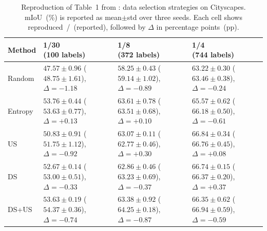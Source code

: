 \begin{table}[H]
\centering
\caption{Reproduction of Table~1 from \cite{hoyer2023improving}: data
selection strategies on Cityscapes. mIoU~(\%) is reported as
mean$\pm$std over three seeds. Each cell shows
reproduced~/~{\scriptsize (reported)}, followed by $\Delta$ in
percentage points~(pp).}
\label{tab:table1_repro}
\renewcommand{\arraystretch}{1.6}
\small
\begin{tabularx}{\textwidth}{lXXX}
\toprule
\textbf{Method} &
\makecell[c]{\textbf{1/30} \\ \textbf{(100 labels)}} &
\makecell[c]{\textbf{1/8} \\ \textbf{(372 labels)}} &
\makecell[c]{\textbf{1/4} \\ \textbf{(744 labels)}} \\
\midrule
Random &
\makecell[c]{$47.57 \pm 0.96$ \\ {\scriptsize ($48.75 \pm 1.61$), $\Delta=-1.18$}} &
\makecell[c]{$58.25 \pm 0.43$ \\ {\scriptsize ($59.14 \pm 1.02$), $\Delta=-0.89$}} &
\makecell[c]{$63.22 \pm 0.30$ \\ {\scriptsize ($63.46 \pm 0.38$), $\Delta=-0.24$}} \\
Entropy &
\makecell[c]{$53.76 \pm 0.44$ \\ {\scriptsize ($53.63 \pm 0.77$), $\Delta=+0.13$}} &
\makecell[c]{$63.61 \pm 0.78$ \\ {\scriptsize ($63.51 \pm 0.68$), $\Delta=+0.10$}} &
\makecell[c]{$65.57 \pm 0.62$ \\ {\scriptsize ($66.18 \pm 0.50$), $\Delta=-0.61$}} \\
US &
\makecell[c]{$50.83 \pm 0.91$ \\ {\scriptsize ($51.75 \pm 1.12$), $\Delta=-0.92$}} &
\makecell[c]{$63.07 \pm 0.11$ \\ {\scriptsize ($62.77 \pm 0.46$), $\Delta=+0.30$}} &
\makecell[c]{$66.84 \pm 0.34$ \\ {\scriptsize ($66.76 \pm 0.45$), $\Delta=+0.08$}} \\
DS &
\makecell[c]{$52.67 \pm 0.14$ \\ {\scriptsize ($53.00 \pm 0.51$), $\Delta=-0.33$}} &
\makecell[c]{$62.86 \pm 0.46$ \\ {\scriptsize ($63.23 \pm 0.69$), $\Delta=-0.37$}} &
\makecell[c]{$66.74 \pm 0.15$ \\ {\scriptsize ($66.37 \pm 0.20$), $\Delta=+0.37$}} \\
DS+US &
\makecell[c]{$53.63 \pm 0.19$ \\ {\scriptsize ($54.37 \pm 0.36$), $\Delta=-0.74$}} &
\makecell[c]{$63.38 \pm 0.92$ \\ {\scriptsize ($64.25 \pm 0.18$), $\Delta=-0.87$}} &
\makecell[c]{$66.35 \pm 0.62$ \\ {\scriptsize ($66.94 \pm 0.59$), $\Delta=-0.59$}} \\
\bottomrule
\end{tabularx}
\end{table}

